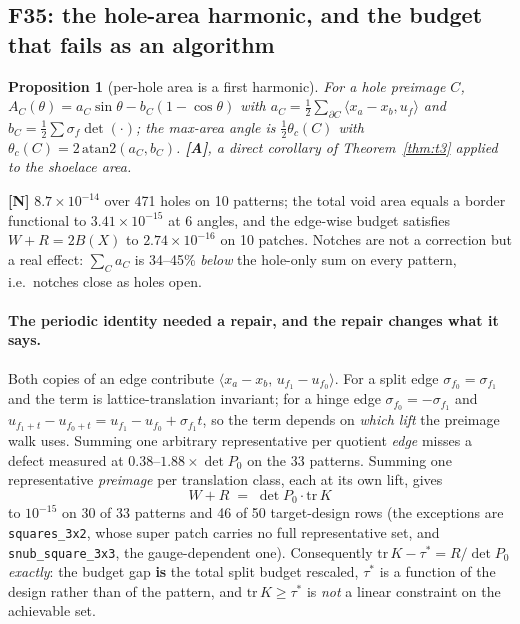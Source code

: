 \documentclass[11pt,a4paper]{article}
\newtheorem{proposition}[theorem]{Proposition}
\theoremstyle{definition}
\newcommand{\file}[1]{\texttt{\small #1}}
\begin{document}
\subsection{F35: the hole-area harmonic, and the budget that fails as an algorithm}

\begin{proposition}[per-hole area is a first harmonic]
For a hole preimage $C$, $A_C(\theta) = a_C\sin\theta - b_C(1-\cos\theta)$ with
$a_C=\tfrac12\sum_{\partial C}\langle x_a-x_b,u_f\rangle$ and
$b_C=\tfrac12\sum\sigma_f\det(\cdot)$; the max-area angle is $\tfrac12\theta_c(C)$ with
$\theta_c(C)=2\,\mathrm{atan2}(a_C,b_C)$. \textbf{[A]}, a direct corollary of
Theorem~\ref{thm:t3} applied to the shoelace area.
\end{proposition}
\noindent\textbf{[N]} $8.7\times10^{-14}$ over 471 holes on 10 patterns; the total void area
equals a border functional to $3.41\times10^{-15}$ at 6 angles, and the edge-wise budget
satisfies $W+R=2B(X)$ to $2.74\times10^{-16}$ on 10 patches. Notches are not a correction but
a real effect: $\sum_C a_C$ is 34--45\% \emph{below} the hole-only sum on every pattern, i.e.\
notches close as holes open.

\paragraph{The periodic identity needed a repair, and the repair changes what it says.} Both
copies of an edge contribute $\langle x_a-x_b,\,u_{f_1}-u_{f_0}\rangle$. For a split edge
$\sigma_{f_0}=\sigma_{f_1}$ and the term is lattice-translation invariant; for a hinge edge
$\sigma_{f_0}=-\sigma_{f_1}$ and
$u_{f_1+t}-u_{f_0+t}=u_{f_1}-u_{f_0}+\sigma_{f_1}t$, so the term depends on \emph{which lift}
the preimage walk uses. Summing one arbitrary representative per quotient \emph{edge} misses a
defect measured at $0.38$--$1.88\times\det P_0$ on the 33 patterns. Summing one representative
\emph{preimage} per translation class, each at its own lift, gives
\begin{equation}
W + R \;=\; \det P_0\cdot\mathrm{tr}\,K
\label{eq:budget}
\end{equation}
to $10^{-15}$ on 30 of 33 patterns and 46 of 50 target-design rows (the exceptions are
\file{squares\_3x2}, whose super patch carries no full representative set, and
\file{snub\_square\_3x3}, the gauge-dependent one). Consequently
$\mathrm{tr}\,K-\tau^* = R/\det P_0$ \emph{exactly}: the budget gap \textbf{is} the total split
budget rescaled, $\tau^*$ is a function of the design rather than of the pattern, and
$\mathrm{tr}\,K\ge\tau^*$ is \emph{not} a linear constraint on the achievable set.
\end{document}

